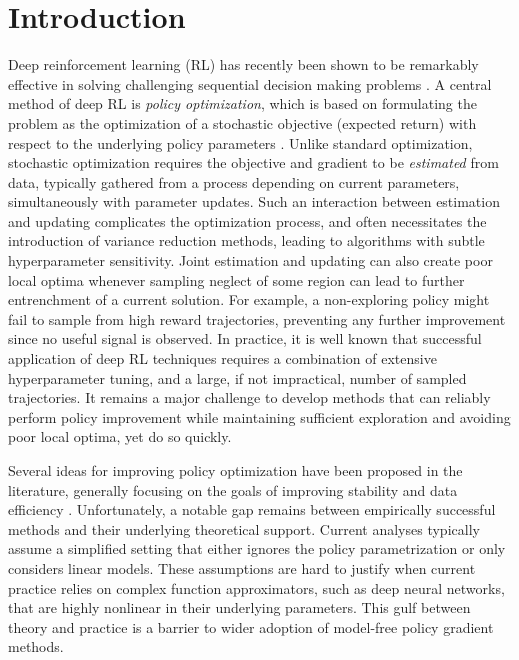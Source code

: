 
\section{Introduction}
\label{sec:intro}


Deep reinforcement learning (RL) has recently
been shown to be remarkably effective in solving
challenging sequential decision making problems
\citep{schulman2015trust,mnih2015human,silver2016mastering}.
A central method of deep RL is \emph{policy optimization},
which is based on formulating the problem
as the optimization of a stochastic objective (expected return)
with respect to the underlying policy parameters
\citep{williams1991function,williams1992simple,sutton1998reinforcement}.
Unlike standard optimization,
stochastic optimization requires the objective and gradient to be 
\emph{estimated} from data,
typically gathered from a process depending on current parameters, 
simultaneously with parameter updates.
Such an interaction between estimation and updating
complicates the optimization process,
and often necessitates the introduction of variance reduction methods,
leading to algorithms with subtle hyperparameter sensitivity.
Joint estimation and updating can also create poor local optima
whenever sampling neglect of some region
can lead to further entrenchment of a current solution.
For example, a non-exploring policy might fail to sample from high
reward trajectories,
preventing any further improvement since no useful signal is observed.
In practice, it is well known that successful application of deep RL techniques
requires a combination of extensive hyperparameter tuning,
and a large, if not impractical, number of sampled trajectories.
It remains a major challenge to develop methods that can reliably
perform policy improvement while maintaining sufficient exploration
and avoiding poor local optima, yet do so quickly.

Several ideas for improving policy optimization have been proposed
in the literature, 
generally focusing on the goals of improving stability and data efficiency
\citep{peters2010relative,van2015learning,fox2015taming,schulman2015trust,montgomery2016guided,nachum2017bridging,nachum2017trust,tangkaratt2017guide,abdolmaleki2018maximum,haarnoja2018soft}. 
Unfortunately, a notable gap remains between empirically successful methods 
and their underlying theoretical support.
Current analyses typically assume a simplified setting that either ignores the 
policy parametrization or only considers linear models.
These assumptions are hard to justify when current practice relies on 
complex function approximators, such as deep neural networks,
that are highly nonlinear in their underlying parameters.
This gulf between theory and practice is
a barrier to wider adoption of model-free policy gradient methods.

